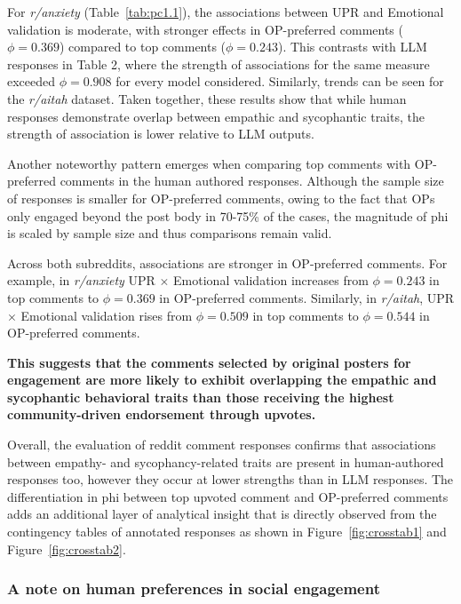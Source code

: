 \smallskip For \textit{r/anxiety} (Table~\ref{tab:pc1.1}), the associations between UPR and Emotional validation is moderate, with stronger effects in OP-preferred comments ($\phi = 0.369$) compared to top comments ($\phi = 0.243$). This contrasts with LLM responses in Table 2, where the strength of associations for the same measure exceeded $\phi = 0.908$ for every model considered. Similarly, trends can be seen for the \textit{r/aitah} dataset. Taken together, these results show that while human responses demonstrate overlap between empathic and sycophantic traits, the strength of association is lower relative to LLM outputs.

\smallskip Another noteworthy pattern emerges when comparing top comments with OP-preferred comments in the human authored responses. Although the sample size of responses is smaller for OP-preferred comments, owing to the fact that OPs only engaged beyond the post body in 70-75\% of the cases, the magnitude of phi is scaled by sample size and thus comparisons remain valid. 

\smallskip Across both subreddits, associations are stronger in OP-preferred comments. For example, in \textit{r/anxiety} UPR $\times$ Emotional validation increases from $\phi = 0.243$ in top comments to $\phi = 0.369$ in OP-preferred comments. Similarly, in \textit{r/aitah}, UPR $\times$ Emotional validation rises from $\phi = 0.509$ in top comments to $\phi = 0.544$ in OP-preferred comments. 

\smallskip \textbf{This suggests that the comments selected by original posters for engagement are more likely to exhibit overlapping the empathic and sycophantic behavioral traits than those receiving the highest community-driven endorsement through upvotes.}

\bigskip Overall, the evaluation of reddit comment responses confirms that associations between empathy- and sycophancy-related traits are present in human-authored responses too, however they occur at lower strengths than in LLM responses. The differentiation in phi between top upvoted comment and OP-preferred comments adds an additional layer of analytical insight that is directly observed from the contingency tables of annotated responses as shown in Figure~\ref{fig:crosstab1} and Figure~\ref{fig:crosstab2}.

\subsubsection{A note on human preferences in social engagement}

